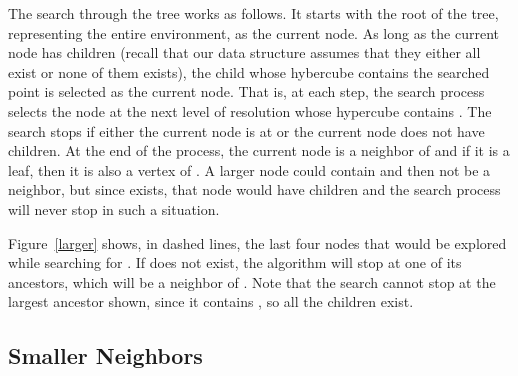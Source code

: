 \documentclass[letterpaper, 10 pt, conference]{ieeeconf}
\theoremstyle{definition}
\begin{document}
The search through the tree works as follows.
It starts with the root of the tree, representing the entire environment, as the current node. As long as the current node has children (recall that our data structure assumes that they either all exist or none of them exists), the child whose hybercube contains the searched point  is selected as the current node. That is, at each step, the search process selects the node at the next level of resolution whose hypercube contains . The search stops if either the current node is at  or the current node does not have children. At the end of the process, the current node is a neighbor of  and if it is a leaf, then it is also a vertex of .
A larger node could contain  and then not be a neighbor, but since  exists, that node would have children and the search process will never stop in such a situation.

Figure~\ref{larger} shows, in dashed lines, the last four nodes that would be explored while searching for . If  does not exist, the algorithm will stop at one of its ancestors, which will be a neighbor of . Note that the search cannot stop at the largest ancestor shown, since it contains , so all the children exist.

\subsection{Smaller Neighbors}
\end{document}
